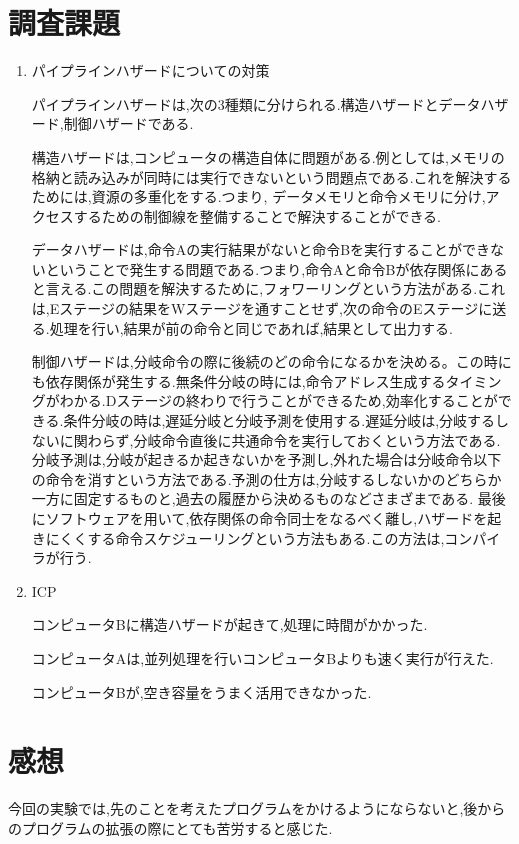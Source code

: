 \documentclass[a4paper,11pt,titlepage]{jarticle}
\begin{document}
  \section{調査課題}
  \begin{enumerate}
  	\item パイプラインハザードについての対策\par
  		パイプラインハザードは,次の3種類に分けられる.構造ハザードとデータハザード,制御ハザードである.\par
  		構造ハザードは,コンピュータの構造自体に問題がある.例としては,メモリの格納と読み込みが同時には実行できないという問題点である.これを解決するためには,資源の多重化をする.つまり, データメモリと命令メモリに分け,アクセスするための制御線を整備することで解決することができる.\par
  		データハザードは,命令Aの実行結果がないと命令Bを実行することができないということで発生する問題である.つまり,命令Aと命令Bが依存関係にあると言える.この問題を解決するために,フォワーリングという方法がある.これは,Eステージの結果をWステージを通すことせず,次の命令のEステージに送る.処理を行い,結果が前の命令と同じであれば,結果として出力する.\par
  		制御ハザードは,分岐命令の際に後続のどの命令になるかを決める。この時にも依存関係が発生する.無条件分岐の時には,命令アドレス生成するタイミングがわかる.Dステージの終わりで行うことができるため,効率化することができる.条件分岐の時は,遅延分岐と分岐予測を使用する.遅延分岐は,分岐するしないに関わらず,分岐命令直後に共通命令を実行しておくという方法である.分岐予測は,分岐が起きるか起きないかを予測し,外れた場合は分岐命令以下の命令を消すという方法である.予測の仕方は,分岐するしないかのどちらか一方に固定するものと,過去の履歴から決めるものなどさまざまである.
  		最後にソフトウェアを用いて,依存関係の命令同士をなるべく離し,ハザードを起きにくくする命令スケジューリングという方法もある.この方法は,コンパイラが行う.\par
  	\item ICP\par
  		コンピュータBに構造ハザードが起きて,処理に時間がかかった.\par
  		コンピュータAは,並列処理を行いコンピュータBよりも速く実行が行えた.\par
  		コンピュータBが,空き容量をうまく活用できなかった.\par
  \end{enumerate}
  \section{感想}
   今回の実験では,先のことを考えたプログラムをかけるようにならないと,後からのプログラムの拡張の際にとても苦労すると感じた.
\end{document}
